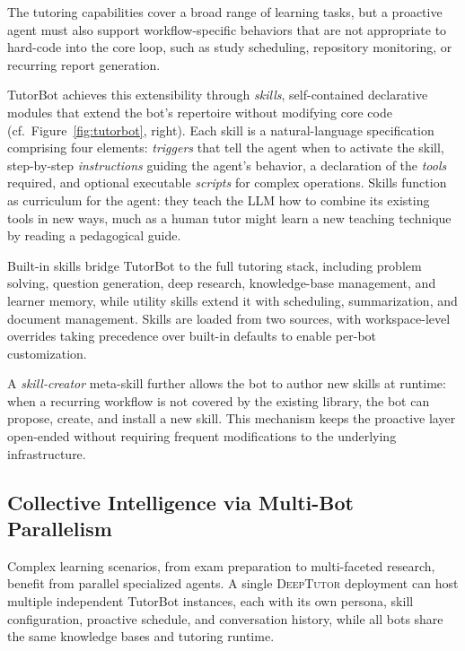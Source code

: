 The tutoring capabilities cover a broad range of learning tasks, but a proactive agent must also support workflow-specific behaviors that are not appropriate to hard-code into the core loop, such as study scheduling, repository monitoring, or recurring report generation.

TutorBot achieves this extensibility through \emph{skills}, self-contained declarative modules that extend the bot's repertoire without modifying core code (cf.\ Figure~\ref{fig:tutorbot}, right).
Each skill is a natural-language specification comprising four elements: \emph{triggers} that tell the agent when to activate the skill, step-by-step \emph{instructions} guiding the agent's behavior, a declaration of the \emph{tools} required, and optional executable \emph{scripts} for complex operations.
Skills function as curriculum for the agent: they teach the LLM how to combine its existing tools in new ways, much as a human tutor might learn a new teaching technique by reading a pedagogical guide.

Built-in skills bridge TutorBot to the full tutoring stack, including problem solving, question generation, deep research, knowledge-base management, and learner memory, while utility skills extend it with scheduling, summarization, and document management.
Skills are loaded from two sources, with workspace-level overrides taking precedence over built-in defaults to enable per-bot customization.

A \emph{skill-creator} meta-skill further allows the bot to author new skills at runtime: when a recurring workflow is not covered by the existing library, the bot can propose, create, and install a new skill.
This mechanism keeps the proactive layer open-ended without requiring frequent modifications to the underlying infrastructure.

\subsection{Collective Intelligence via Multi-Bot Parallelism}
\label{sec:multibot}

Complex learning scenarios, from exam preparation to multi-faceted research, benefit from parallel specialized agents.
A single \textsc{DeepTutor} deployment can host multiple independent TutorBot instances, each with its own persona, skill configuration, proactive schedule, and conversation history, while all bots share the same knowledge bases and tutoring runtime.

